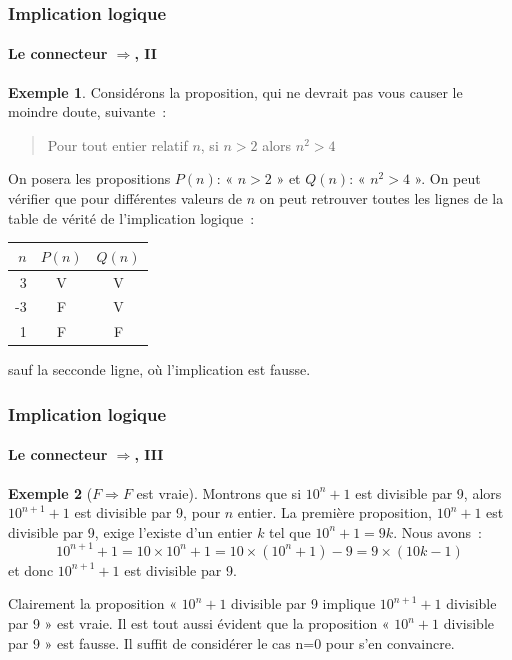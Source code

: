 \documentclass[10pt,notheorems]{beamer}
\theoremstyle{plain}
\theoremstyle{definition} %
\newtheorem{example}{Exemple}
\begin{document}
\begin{frame}
  \frametitle{Implication logique}
  \framesubtitle{Le connecteur $\Rightarrow$, II}

  \begin{example}\label{ex:implication:1}
    Considérons la proposition, qui ne devrait pas vous causer le
    moindre doute, suivante :
    \begin{quote}
      Pour tout entier relatif $n$, si $n>2$ alors $n^2>4$
    \end{quote}

    On posera les propositions $P(n)$: « $n>2$ » et $Q(n)$: 
    « $n^2>4$ ». On peut vérifier que pour différentes valeurs de $n$ on
    peut retrouver toutes les lignes de la table de vérité de
    l'implication logique :
    \begin{table}[H]
      \centering
      \begin{tabular}[H]{|r|cc|}
        \hline
        $n$ & $P(n)$ & $Q(n)$\\ \hline
        3 & V & V \\
        -3 & F & V \\
        1 & F & F \\
        \hline\hline
      \end{tabular}
    \end{table}
    sauf la secconde ligne, où l'implication est fausse.
  \end{example}

\end{frame}


\begin{frame}
  \frametitle{Implication logique}
  \framesubtitle{Le connecteur $\Rightarrow$, III}

  \begin{example}[$F\Rightarrow F$ est vraie]\label{ex:implication:2}
    Montrons que si $10^n+1$ est divisible par 9, alors $10^{n+1}+1$
    est divisible par 9, pour $n$ entier. La première proposition,
    $10^n+1$ est divisible par 9, exige l'existe d'un entier $k$ tel
    que $10^n+1 = 9k$. Nous avons :
    \[
      10^{n+1}+1 = 10\times 10^n+1 =
      10\times(10^{n}+1)-9=9\times(10k-1)
    \]
    et donc $10^{n+1}+1$ est divisible par 9.\newline

    Clairement la proposition « $10^n+1$ divisible par 9 implique
    $10^{n+1}+1$ divisible par 9 » est vraie. Il est tout aussi
    évident que la proposition « $10^n+1$ divisible par 9 » est
    fausse. Il suffit de considérer le cas n=0 pour s'en convaincre.
  \end{example}

\end{frame}
\end{document}
